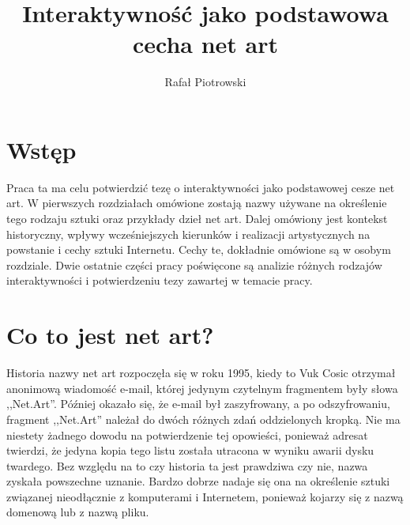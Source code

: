 \documentclass[a4paper,12pt,twoside]{article}
\author{Rafał Piotrowski}
\title{Interaktywność jako podstawowa cecha net art}
\begin{document}
\maketitle


\section{Wstęp}
Praca ta ma celu potwierdzić tezę o interaktywności
jako podstawowej cesze net art. W pierwszych rozdziałach omówione
zostają nazwy używane na określenie tego rodzaju sztuki
oraz przykłady dzieł net art. Dalej omówiony jest kontekst historyczny,
wpływy wcześniejszych kierunków i realizacji artystycznych na powstanie
i cechy sztuki Internetu. Cechy te, dokładnie omówione są w osobym rozdziale.
Dwie ostatnie części pracy poświęcone są analizie różnych rodzajów
interaktywności i potwierdzeniu tezy zawartej w temacie pracy.

\section{Co to jest net art?}

Historia nazwy net art rozpoczęła się w roku 1995, kiedy to Vuk Cosic
otrzymał anonimową wiadomość e-mail, której jedynym czytelnym fragmentem
były słowa ,,Net.Art''. Później okazało się, że e-mail był zaszyfrowany,
a po odszyfrowaniu, fragment ,,Net.Art'' należał do dwóch różnych zdań
oddzielonych kropką. Nie ma niestety żadnego dowodu na potwierdzenie
tej opowieści, ponieważ adresat twierdzi, że jedyna kopia tego listu
została utracona w wyniku awarii dysku twardego. Bez względu na to
czy historia ta jest prawdziwa czy nie, nazwa zyskała powszechne uznanie.
Bardzo dobrze nadaje się ona na określenie sztuki związanej
nieodłącznie z komputerami i Internetem, ponieważ kojarzy się
z nazwą domenową lub z nazwą pliku.
\end{document}
